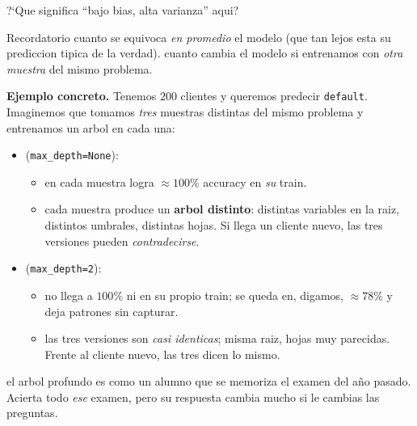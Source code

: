 \begin{frame}{?`Que significa ``bajo bias, alta varianza'' aqui?}
\begin{block}{Recordatorio}
\small
{} cuanto se equivoca \emph{en promedio} el modelo (que tan lejos esta su prediccion tipica de la verdad).
\quad
{} cuanto cambia el modelo si entrenamos con \emph{otra muestra} del mismo problema.
\end{block}

\vspace{0.25em}
\textbf{Ejemplo concreto.} Tenemos $200$ clientes y queremos predecir \texttt{default}. Imaginemos que tomamos \emph{tres} muestras distintas del mismo problema y entrenamos un arbol en cada una:

\vspace{0.2em}
\begin{itemize}\footnotesize
  \item {} (\texttt{max\_depth=None}):
  \begin{itemize}\scriptsize
    \item {} en cada muestra logra $\approx 100\%$ accuracy en \emph{su} train.
    \item {} cada muestra produce un \textbf{arbol distinto}: distintas variables en la raiz, distintos umbrales, distintas hojas. Si llega un cliente nuevo, las tres versiones pueden \emph{contradecirse}.
  \end{itemize}
  \item {} (\texttt{max\_depth=2}):
  \begin{itemize}\scriptsize
    \item {} no llega a $100\%$ ni en su propio train; se queda en, digamos, $\approx 78\%$ y deja patrones sin capturar.
    \item {} las tres versiones son \emph{casi identicas}; misma raiz, hojas muy parecidas. Frente al cliente nuevo, las tres dicen lo mismo.
  \end{itemize}
\end{itemize}

\vspace{0.15em}
 el arbol profundo es como un alumno que se memoriza el examen del año pasado. Acierta todo \emph{ese} examen, pero su respuesta cambia mucho si le cambias las preguntas.
\end{frame}

